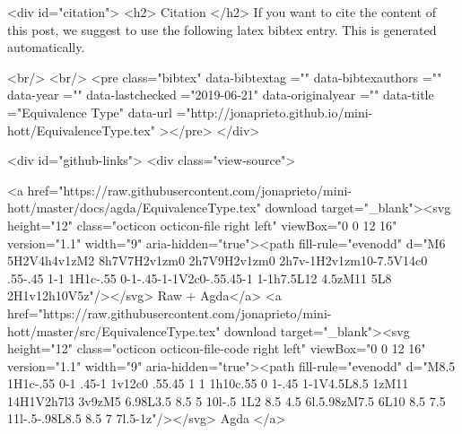   
  <div id="citation">
  <h2> Citation </h2>
  If you want to cite the content of this post,
  we suggest to use the following latex bibtex entry.
  This is generated automatically.

  <br/>
  <br/>
  <pre class="bibtex"
       data-bibtextag =""
       data-bibtexauthors =""
       data-year =""
       data-lastchecked ="2019-06-21"
       data-originalyear =""
       data-title ="Equivalence Type"
       data-url ="http://jonaprieto.github.io/mini-hott/EquivalenceType.tex"
  ></pre>
  </div>
  

  <div id="github-links">
    <div class="view-source">
      
        <a href="https://raw.githubusercontent.com/jonaprieto/mini-hott/master/docs/agda/EquivalenceType.tex" download target="_blank"><svg height="12" class="octicon octicon-file right left" viewBox="0 0 12 16" version="1.1" width="9" aria-hidden="true"><path fill-rule="evenodd" d="M6 5H2V4h4v1zM2 8h7V7H2v1zm0 2h7V9H2v1zm0 2h7v-1H2v1zm10-7.5V14c0 .55-.45 1-1 1H1c-.55 0-1-.45-1-1V2c0-.55.45-1 1-1h7.5L12 4.5zM11 5L8 2H1v12h10V5z"/></svg> Raw + Agda</a>
        <a href="https://raw.githubusercontent.com/jonaprieto/mini-hott/master/src/EquivalenceType.tex" download target="_blank"><svg height="12" class="octicon octicon-file-code right left" viewBox="0 0 12 16" version="1.1" width="9" aria-hidden="true"><path fill-rule="evenodd" d="M8.5 1H1c-.55 0-1 .45-1 1v12c0 .55.45 1 1 1h10c.55 0 1-.45 1-1V4.5L8.5 1zM11 14H1V2h7l3 3v9zM5 6.98L3.5 8.5 5 10l-.5 1L2 8.5 4.5 6l.5.98zM7.5 6L10 8.5 7.5 11l-.5-.98L8.5 8.5 7 7l.5-1z"/></svg> Agda </a>
      
